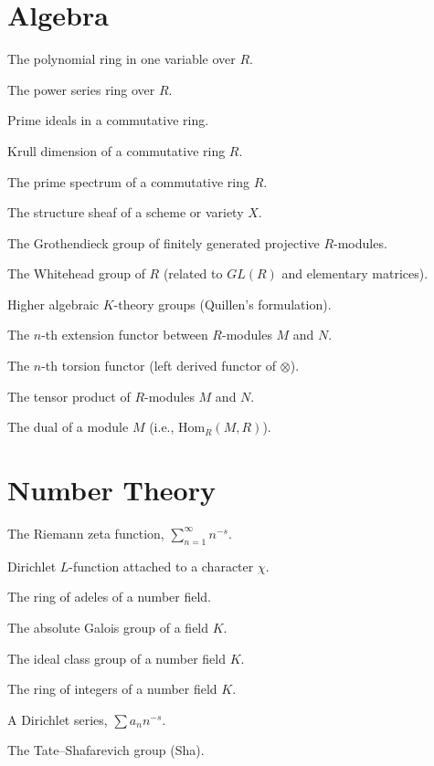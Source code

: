 \documentclass[12pt,a4paper]{book}
\theoremstyle{definition}
\theoremstyle{remark}
\let\origzeta\zeta
\def\zeta{\ensuremath{\origzeta}}
\let\origchi\chi
\def\chi{\ensuremath{\origchi}}
\begin{document}
\section*{Algebra}
\begin{description}[style=nextline, leftmargin=2cm]
\item[{$R[x]$}] The polynomial ring in one variable over $R$.
\item[{$R[[x]]$}] The power series ring over $R$.
\item[$\mathfrak{p}, \mathfrak{q}$] Prime ideals in a commutative ring.
\item[$\dim(R)$] Krull dimension of a commutative ring $R$.
\item[$\text{Spec}(R)$] The prime spectrum of a commutative ring $R$.
\item[$\mathcal{O}_X$] The structure sheaf of a scheme or variety $X$.
\item[$K_0(R)$] The Grothendieck group of finitely generated projective $R$-modules.
\item[$K_1(R)$] The Whitehead group of $R$ (related to $GL(R)$ and elementary matrices).
\item[$K_n(R)$] Higher algebraic $K$-theory groups (Quillen's formulation).
\item[$\text{Ext}^n_R(M, N)$] The $n$-th extension functor between $R$-modules $M$ and $N$.
\item[$\text{Tor}_n^R(M, N)$] The $n$-th torsion functor (left derived functor of $\otimes$).
\item[$M \otimes_R N$] The tensor product of $R$-modules $M$ and $N$.
\item[$M^{\vee}$] The dual of a module $M$ (i.e., $\text{Hom}_R(M, R)$).
\end{description}

\section*{Number Theory}
\begin{description}[style=nextline, leftmargin=2cm]
\item[$\zeta(s)$] The Riemann zeta function, $\sum_{n=1}^{\infty} n^{-s}$.
\item[$L(s, \chi)$] Dirichlet $L$-function attached to a character $\chi$.
\item[$\mathbb{A}$] The ring of adeles of a number field.
\item[$\text{Gal}(\bar{K}/K)$] The absolute Galois group of a field $K$.
\item[$\text{Cl}(K)$] The ideal class group of a number field $K$.
\item[$\mathcal{O}_K$] The ring of integers of a number field $K$.
\item[$D(s)$] A Dirichlet series, $\sum a_n n^{-s}$.
\item[$\Sh$] The Tate--Shafarevich group (Sha).
\end{description}
\end{document}
